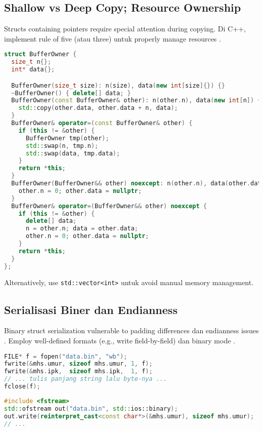 \documentclass[../main.tex]{subfiles}
\begin{document}
\subsection{Shallow vs Deep Copy; Resource Ownership}
Structs containing pointers require special attention during copying. Di C++, implement rule of five (atau three) untuk properly manage resources \parencite{cpp-special-member-functions}.

\begin{lstlisting}[language=C++, caption={Aturan lima untuk kepemilikan resource}]
struct BufferOwner {
  size_t n{};
  int* data{};

  BufferOwner(size_t size): n(size), data(new int[size]{}) {}
  ~BufferOwner() { delete[] data; }
  BufferOwner(const BufferOwner& other): n(other.n), data(new int[n]) {
    std::copy(other.data, other.data + n, data);
  }
  BufferOwner& operator=(const BufferOwner& other) {
    if (this != &other) {
      BufferOwner tmp(other);
      std::swap(n, tmp.n);
      std::swap(data, tmp.data);
    }
    return *this;
  }
  BufferOwner(BufferOwner&& other) noexcept: n(other.n), data(other.data) {
    other.n = 0; other.data = nullptr;
  }
  BufferOwner& operator=(BufferOwner&& other) noexcept {
    if (this != &other) {
      delete[] data;
      n = other.n; data = other.data;
      other.n = 0; other.data = nullptr;
    }
    return *this;
  }
};
\end{lstlisting}

Alternatively, use \texttt{std::vector<int>} untuk avoid manual memory management.

\subsection{Serialisasi Biner dan Endianness}
Binary struct serialization vulnerable to padding differences dan endianness issues \parencite{endianness-wiki}. Employ well-defined formats (e.g., write field-by-field) dan binary mode \parencite{c-fwrite,cpp-openmode-binary}.

\begin{lstlisting}[language=C, caption={Tulis baca biner per-field (C)}]
FILE* f = fopen("data.bin", "wb");
fwrite(&mhs.umur, sizeof mhs.umur, 1, f);
fwrite(&mhs.ipk,  sizeof mhs.ipk,  1, f);
// ... tulis panjang string lalu byte-nya ...
fclose(f);
\end{lstlisting}

\begin{lstlisting}[language=C++, caption={Mode biner di C++}]
#include <fstream>
std::ofstream out("data.bin", std::ios::binary);
out.write(reinterpret_cast<const char*>(&mhs.umur), sizeof mhs.umur);
// ...
\end{lstlisting}
\end{document}
